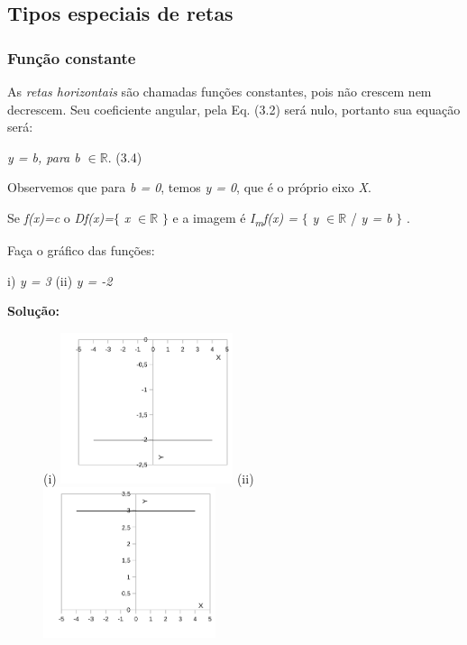 \subsection{Tipos especiais de retas}

\subsubsection{Função constante}

As \textit{retas horizontais} são chamadas funções constantes, pois não crescem nem decrescem. Seu coeficiente angular, pela Eq. (3.2) será nulo, portanto sua equação será:

\begin{caixa}
\textit{y = b, para b $ \in \mathbb{R} $}. \tab (3.4)
\end{caixa}

Observemos que para \textit{b = 0}, temos \textit{y = 0}, que é o próprio eixo \textit{X}.

Se \textit{f(x)=c}  o \textit{Df(x)=}$ \{ $ \textit{ x $\in \mathbb{R}$} $ \} $  e a imagem é    \textit{I\textsubscript{m}f(x) =} $ \{ $ \textit{ y $\in \mathbb{R}$} / \textit{y = b }$ \} $ .

\begin{texemplo}
Faça o gráfico das funções: 

i) \textit{y = 3} \tab (ii) \textit{y = -2}

\textbf{Solução:}

\begin{figure}[H]
	(i) \includegraphics[width=0.45\textwidth]{capitulos/funcao_do_primeiro_grau/media/image16.pdf} 
	(ii) \includegraphics[width=0.45\textwidth]{capitulos/funcao_do_primeiro_grau/media/image17.pdf}
\end{figure}
\end{texemplo}


